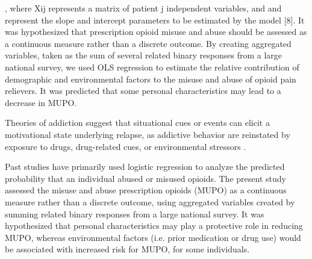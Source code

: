 \documentclass[sigconf]{acmart}
\begin{document}
, where Xij represents a matrix of patient j independent variables, and  and  represent the slope and intercept parameters to be estimated by the model [8]. It was hypothesized that prescription opioid misuse and abuse should be assessed as a continuous measure rather than a discrete outcome. By creating aggregated variables, taken as the sum of several related binary responses from a large national survey, we used OLS regression to estimate the relative contribution of demographic and environmental factors to the misuse and abuse of opioid pain relievers. It was predicted that some personal characteristics may lead to a decrease in MUPO. 



Theories of addiction suggest that situational cues or events can elicit a 
motivational state underlying relapse, as addictive behavior are reinstated by 
exposure to drugs, drug-related cues, or environmental stressors \cite{shaham03}. 




 Past studies have 
primarily used logistic regression to analyze the predicted probability that 
an individual abused or misused opioids. The present study assessed the misuse 
and abuse prescription opioids (MUPO) as a continuous measure rather than a 
discrete outcome, using aggregated variables created by summing related binary 
responses from a large national survey. It was hypothesized that personal 
characteristics may play a protective role in reducing MUPO, whereas 
environmental factors (i.e. prior medication or drug use) would be associated 
with increased risk for MUPO, for some individuals. 
\end{document}
